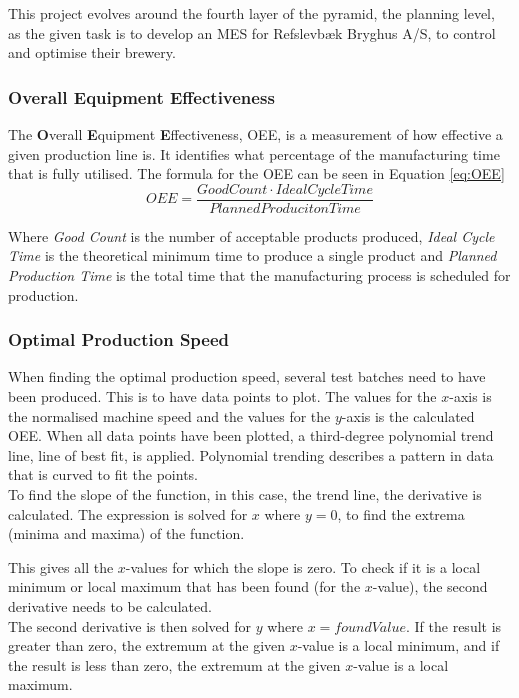 This project evolves around the fourth layer of the pyramid, the planning level,
as the given task is to develop an MES for Refslevbæk Bryghus A/S, to control
and optimise their brewery. 


\subsubsection{Overall Equipment Effectiveness}
The \textbf{O}verall \textbf{E}quipment \textbf{E}ffectiveness, OEE, is a
measurement of how effective a given production line is. It identifies what
percentage of the manufacturing time that is fully utilised. The formula for
the OEE can be seen in Equation \ref{eq:OEE}
\begin{equation} \label{eq:OEE}
    OEE = \frac{Good Count \cdot Ideal Cycle Time}{Planned Produciton Time}
\end{equation}

Where \textit{Good Count} is the number of acceptable products produced,
\textit{Ideal Cycle Time} is the theoretical minimum time to produce a single
product and \textit{Planned Production Time} is the total time that the
manufacturing process is scheduled for production. \cite{oee}

\subsubsection{Optimal Production Speed}
When finding the optimal production speed, several test batches need to have
been produced. This is to have data points to plot. The values for the
\(x\)-axis is the normalised machine speed and the values for the \(y\)-axis is
the calculated OEE. When all data points have been plotted, a third-degree
polynomial trend line, line of best fit, is applied. Polynomial trending
describes a pattern in data that is curved to fit the points.\\

To find the slope of the function, in this case, the trend line, the derivative
is calculated. The expression is solved for \(x\) where \(y = 0\), to find the
extrema (minima and maxima) of the function.

This gives all the \(x\)-values
for which the slope is zero. To check if it is a local minimum or local maximum
that has been found (for the \(x\)-value), the second derivative needs to be
calculated.\\

The second derivative is then solved for \(y\) where \(x = found Value\). If the
result is greater than zero, the extremum at the given \(x\)-value is a local
minimum, and if the result is less than zero, the extremum at the given 
\(x\)-value is a local maximum.\\ \cite{ops}

